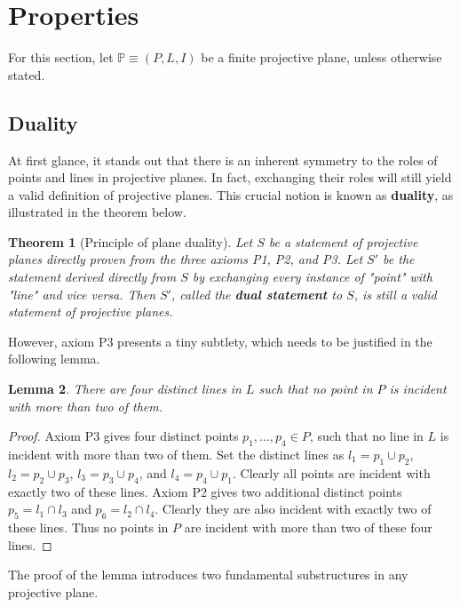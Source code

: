 \documentclass{report}
\renewcommand{\P}{\mathbb{P}}
\newtheorem{theorem}{Theorem}[section]
\newtheorem{lemma}[theorem]{Lemma}
\theoremstyle{definition}\newtheorem*{definition}{Definition}
\theoremstyle{definition}\newtheorem*{example}{Example}
\theoremstyle{remark}\newtheorem*{remark}{Remark}
\begin{document}
\section{Properties}

For this section, let $ \P \equiv (P, L, I) $ be a finite projective plane, unless otherwise stated.

\subsection{Duality}

At first glance, it stands out that there is an inherent symmetry to the roles of points and lines in projective planes. In fact, exchanging their roles will still yield a valid definition of projective planes. This crucial notion is known as \textbf{duality}, as illustrated in the theorem below.

\begin{theorem}[Principle of plane duality]
\label{thm:duality}
Let $ S $ be a statement of projective planes directly proven from the three axioms P1, P2, and P3. Let $ S' $ be the statement derived directly from $ S $ by exchanging every instance of "point" with "line" and vice versa. Then $ S' $, called the \textbf{dual statement} to $ S $, is still a valid statement of projective planes.
\end{theorem}

However, axiom P3 presents a tiny subtlety, which needs to be justified in the following lemma.

\begin{lemma}
\label{lemma:quadilateral}
There are four distinct lines in $ L $ such that no point in $ P $ is incident with more than two of them.
\end{lemma}

\begin{proof}
Axiom P3 gives four distinct points $ p_1, ..., p_4 \in P $, such that no line in $ L $ is incident with more than two of them. Set the distinct lines as $ l_1 = p_1 \cup p_2 $, $ l_2 = p_2 \cup p_3 $, $ l_3 = p_3 \cup p_4 $, and $ l_4 = p_4 \cup p_1 $. Clearly all points are incident with exactly two of these lines. Axiom P2 gives two additional distinct points $ p_5 = l_1 \cap l_3 $ and $ p_6 = l_2 \cap l_4 $. Clearly they are also incident with exactly two of these lines. Thus no points in $ P $ are incident with more than two of these four lines.
\end{proof}

The proof of the lemma introduces two fundamental substructures in any projective plane.
\end{document}
